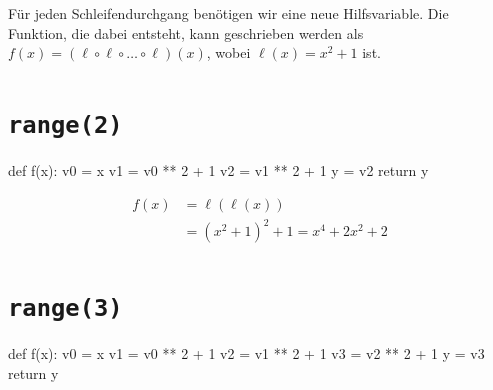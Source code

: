 \documentclass[
  a4paper,
  DIV=11]{scrreprt}
\newenvironment{Shaded}{\begin{snugshade}}{\end{snugshade}}
\newcommand{\ControlFlowTok}[1]{\textcolor[rgb]{0.00,0.23,0.31}{#1}}
\newcommand{\DecValTok}[1]{\textcolor[rgb]{0.68,0.00,0.00}{#1}}
\newcommand{\KeywordTok}[1]{\textcolor[rgb]{0.00,0.23,0.31}{#1}}
\newcommand{\NormalTok}[1]{\textcolor[rgb]{0.00,0.23,0.31}{#1}}
\newcommand{\OperatorTok}[1]{\textcolor[rgb]{0.37,0.37,0.37}{#1}}
\theoremstyle{definition}
\theoremstyle{definition}
\theoremstyle{remark}
\begin{document}
\begin{tcolorbox}[enhanced jigsaw, titlerule=0mm, title=\textcolor{quarto-callout-tip-color}{\faLightbulb}\hspace{0.5em}{Lösung}, breakable, coltitle=black, leftrule=.75mm, bottomrule=.15mm, colback=white, rightrule=.15mm, opacitybacktitle=0.6, bottomtitle=1mm, toptitle=1mm, left=2mm, toprule=.15mm, colbacktitle=quarto-callout-tip-color!10!white, colframe=quarto-callout-tip-color-frame, arc=.35mm, opacityback=0]

Für jeden Schleifendurchgang benötigen wir eine neue Hilfsvariable. Die
Funktion, die dabei entsteht, kann geschrieben werden als
\(f(x) = (\ell \circ \ell \circ \ldots \circ \ell)(x)\), wobei
\(\ell(x) = x^2 + 1\) ist.

\section{\texorpdfstring{\texttt{range(2)}}{range(2)}}

\begin{Shaded}
\begin{Highlighting}[]
\KeywordTok{def}\NormalTok{ f(x):}
\NormalTok{    v0 }\OperatorTok{=}\NormalTok{ x}
\NormalTok{    v1 }\OperatorTok{=}\NormalTok{ v0 }\OperatorTok{**} \DecValTok{2} \OperatorTok{+} \DecValTok{1}
\NormalTok{    v2 }\OperatorTok{=}\NormalTok{ v1 }\OperatorTok{**} \DecValTok{2} \OperatorTok{+} \DecValTok{1}
\NormalTok{    y }\OperatorTok{=}\NormalTok{ v2}
    \ControlFlowTok{return}\NormalTok{ y}
\end{Highlighting}
\end{Shaded}

\begin{align*}
    f(x) &= \ell(\ell(x)) \\ 
         &= (x^2 + 1)^2 + 1 = x^4 + 2x^2 + 2
\end{align*}

\section{\texorpdfstring{\texttt{range(3)}}{range(3)}}

\begin{Shaded}
\begin{Highlighting}[]
\KeywordTok{def}\NormalTok{ f(x):}
\NormalTok{    v0 }\OperatorTok{=}\NormalTok{ x}
\NormalTok{    v1 }\OperatorTok{=}\NormalTok{ v0 }\OperatorTok{**} \DecValTok{2} \OperatorTok{+} \DecValTok{1}
\NormalTok{    v2 }\OperatorTok{=}\NormalTok{ v1 }\OperatorTok{**} \DecValTok{2} \OperatorTok{+} \DecValTok{1}
\NormalTok{    v3 }\OperatorTok{=}\NormalTok{ v2 }\OperatorTok{**} \DecValTok{2} \OperatorTok{+} \DecValTok{1}
\NormalTok{    y }\OperatorTok{=}\NormalTok{ v3}
    \ControlFlowTok{return}\NormalTok{ y}
\end{Highlighting}
\end{Shaded}


\end{tcolorbox}
\end{document}
